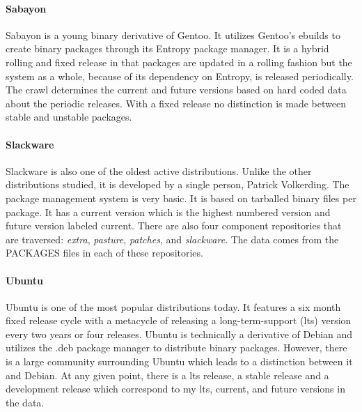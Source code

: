\documentclass[letterpaper,10pt]{article}
\begin{document}
\paragraph{Sabayon}
Sabayon is a young binary derivative of Gentoo.  It utilizes Gentoo's ebuilds to create binary packages through its Entropy package manager.  It is a hybrid rolling and fixed release in that packages are updated in a rolling fashion but the system as a whole, because of its dependency on Entropy, is released periodically.  The crawl determines the current and future versions based on hard coded data about the periodic releases.  With a fixed release no distinction is made between stable and unstable packages.
\paragraph{Slackware}
Slackware is also one of the oldest active distributions.  Unlike the other distributions studied, it is developed by a single person, Patrick Volkerding.  The package management system is very basic.  It is based on tarballed binary files per package.  It has a current version which is the highest numbered version and future version labeled current.  There are also four component repositories that are traversed: \emph{extra}, \emph{pasture}, \emph{patches}, and \emph{slackware}.  The data comes from the PACKAGES files in each of these repositories.
\paragraph{Ubuntu}
Ubuntu is one of the most popular distributions today.  It features a six month fixed release cycle with a metacycle of releasing a long-term-support (lts) version every two years or four releases.  Ubuntu is technically a derivative of Debian and utilizes the .deb package manager to distribute binary packages.  However, there is a large community surrounding Ubuntu which leads to a distinction between it and Debian.  At any given point, there is a lts release, a stable release and a development release which correspond to my lts, current, and future versions in the data.
\end{document}
